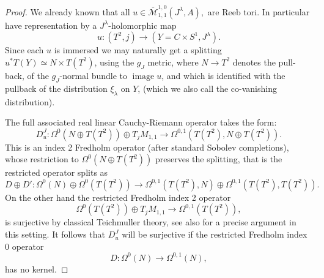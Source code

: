 \documentclass{amsart}
\numberwithin{equation}{section}
\theoremstyle{definition}
\theoremstyle{remark}
\DeclareMathOperator{\image}{\mathrm{image}}
\begin{document}
\begin{proof}
We already known that all  $u \in \overline{\mathcal{M}}_{1,1} ^{1,0}   (J ^{\lambda} 
   , {A} ),$ are Reeb tori. In particular have representation by a $J ^{\lambda} $-holomorphic map $$u: (T ^{2},j) \to (Y = C \times S ^{1}, J ^{\lambda}).  $$
Since each $u$ is immersed we may naturally get a splitting $u ^{*}T (Y) \simeq N \times T (T ^{2})   $,
using the $g _{J} $ metric, where $N \to T ^{2}  $ denotes the pull-back, of the  $g _{J} $-normal bundle to $\image u$, and which is identified with the pullback of the distribution $\xi _{\lambda} $ on $Y$, (which we also call the co-vanishing distribution).

The full associated real linear Cauchy-Riemann operator takes the
form:
\begin{equation} \label{eq:fullD}
   D ^{J}_{u}: \Omega ^{0} (N  \oplus T (T ^{2})  ) \oplus T _{j} M  _{1,1}   \to \Omega ^{0,1}
   (T(T ^{2}), N \oplus T (T ^{2}) ). 
\end{equation}
This is an index 2 Fredholm operator (after standard Sobolev
completions), whose restriction to $\Omega
^{0} (N \oplus T (T ^{2})  )$ preserves the splitting, that is the
restricted operator splits as 
\begin{equation*}
D \oplus D':   \Omega ^{0} (N) \oplus \Omega ^{0} (T (T ^{2})  )    \to \Omega ^{0,1}
(T (T ^{2}), N ) \oplus \Omega ^{0,1}(T (T ^{2}), T (T ^{2}) ).
\end{equation*}
On the other hand the restricted Fredholm index 2 operator 
\begin{equation*}
\Omega ^{0} (T (T ^{2})) \oplus T _{j} M  _{1,1}  \to \Omega ^{0,1}(T (T ^{2}) ),
\end{equation*}
is surjective by classical Teichmuller theory, see also \cite [Lemma 3.3]{citeWendlAutomatic} for a precise argument in this setting.
It follows that $D ^{J}_{u}  $ will be surjective
if  
the restricted Fredholm index 0 operator
\begin{equation*}
D: \Omega ^{0} (N) \to \Omega ^{0,1}
(N),
\end{equation*}
has no kernel.


\end{proof}
\end{document}
